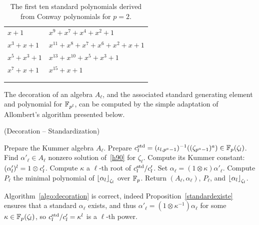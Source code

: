 \documentclass[sigconf]{acmart}
\begin{document}
\begin{table}[b]
  \centering
  \small
  \begin{tabularx}{\columnwidth}{>{\raggedleft\arraybackslash}X | >{\raggedleft\arraybackslash}X}
    $x+1$ & $x^9+x^7+x^4+x^2+1$\\
    $x^3+x+1$ & $x^{11}+x^8+x^7+x^6+x^2+x+1$\\
    $x^5+x^3+1$ & $x^{13}+x^{10}+x^5+x^3+1$\\
    $x^7+x+1$ & $x^{15}+x+1$ \\[0.3em]
    \multicolumn{2}{r}{$x^{17}+x^{11}+x^{10}+x^8+ x^7+x^6+x^4+x^3+x^2+x+1$} \\
    \multicolumn{2}{r}{$x^{19}+x^{17}+x^{16}+x^{15}+x^{14}+x^{13}+x^{12}+x^8+x^7+x^6+x^5+x^3+1$}
  \end{tabularx}
  
  \caption{The first ten standard polynomials derived from Conway
    polynomials for $p=2$.}
  \label{tab:std-polys}
\end{table}


The decoration of an algebra $A_\ell$, and the associated standard
generating element and polynomial for $\mathbb{F}_{p^l}$, can be computed by the simple adaptation of
Allombert's algorithm presented below. %

\begin{algorithm}
  \caption{(Decoration -- Standardization)}
  \label{algo:decoration}
  \begin{algorithmic}[1]
  \STATE Prepare the Kummer algebra $A_\ell$.
  \STATE Prepare $c^{\mathrm{std}}_l=({\iota_{{l},{p^a-1}}})^{-1}((\zeta_{p^a-1})^a)\in\mathbb{F}_p(\zeta_l)$.
  \STATE Find $\alpha'_\ell\in A_\ell$ nonzero solution of~\eqref{h90} for $\zeta_\ell$.
  \STATE Compute its Kummer constant: $(\alpha'_l)^l=1\otimes c'_l$.
  \STATE Compute $\kappa$ a $\ell$-th root of $c^{\mathrm{std}}_l/c'_l$.
  \STATE Set $\alpha_{\ell}=(1\otimes\kappa)\alpha'_\ell$.
  \STATE Compute $P_\ell$ the minimal polynomial of $\left\lfloor \alpha_{l} \right\rfloor_{\zeta_l}$ over $\mathbb{F}_{p}$.
  \STATE Return $(A_\ell,\alpha_\ell)$, $P_\ell$, and $\left\lfloor \alpha_l \right\rfloor_{\zeta_l}$.
  \end{algorithmic}
\end{algorithm}

Algorithm~\ref{algo:decoration} is correct, indeed Proposition~\ref{standardexiste} ensures that
a standard $\alpha_{\ell}$ exists, and thus $\alpha'_\ell=(1\otimes\kappa^{-1})\alpha_{\ell}$
for some $\kappa\in\mathbb{F}_{p}(\zeta_l)$, so $c^{\mathrm{std}}_l/c'_l=\kappa^l$ is a $\ell$-th power.
\end{document}
